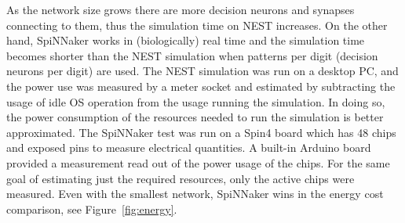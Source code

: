 As the network size grows there are more decision neurons and synapses connecting to them, thus the simulation time on NEST increases.
On the other hand, SpiNNaker works in (biologically) real time and the simulation time becomes shorter than the NEST simulation when \DIFdelbegin {}\DIFdelend \DIFaddbegin {}\DIFaddend patterns per digit (\DIFdelbegin {}\DIFdelend \DIFaddbegin {}\DIFaddend decision neurons per digit) are used.
The NEST simulation was run on a desktop PC, and the power use was measured by a meter socket and estimated by subtracting the usage of idle OS operation from the usage running the simulation.
In doing so, the power consumption of the resources needed to run the simulation is better approximated.
The SpiNNaker test was run on a Spin4 board which has 48 chips and exposed pins to measure electrical quantities.
A built-in Arduino board provided a measurement read out of the power usage of the chips.
For the same goal of estimating just the required resources, only the active chips were measured.
Even with the smallest network, SpiNNaker wins in the energy cost comparison, see Figure~\ref{fig:energy}.
